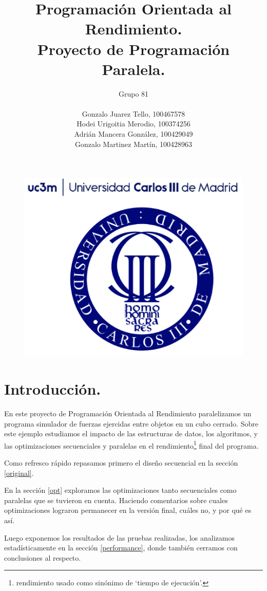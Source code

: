 \documentclass{article}
\title{Programación Orientada al Rendimiento.\\Proyecto de Programación Paralela.}
\author{Grupo 81\\ \\
	Gonzalo Juarez Tello, 100467578\\
	Hodei Urigoitia Merodio, 100374256\\
	Adrián Mancera González, 100429049\\
	Gonzalo Martinez Martín, 100428963
}
\date{}
\begin{document}
\begin{figure}
	\includegraphics[width=\linewidth,height=0.7\textwidth]{resources/logo_uc3m.png}
\end{figure}
\maketitle
\newpage

\tableofcontents
\newpage

\section{Introducción.\label{intro}}
En este proyecto de Programación Orientada al Rendimiento paralelizamos
un programa simulador de fuerzas ejercidas entre objetos
en un cubo cerrado. Sobre este ejemplo estudiamos el impacto de las
estructuras de datos, los algoritmos, y las optimizaciones secuenciales
y paralelas en el rendimiento\footnote{rendimiento usado como sinónimo de
`tiempo de ejecución'.} final del programa.

Como refresco rápido repasamos primero el diseño secuencial en la sección \ref{original}.


En la sección \ref{opt} exploramos las optimizaciones tanto secuenciales como
paralelas que se tuvieron en cuenta. Haciendo comentarios
sobre cuales optimizaciones lograron permanecer en la versión final, cuáles no, y por qué es así.


Luego exponemos los resultados de las pruebas realizadas, los analizamos estadísticamente en la sección \ref{performance},
donde también cerramos con conclusiones al respecto.
\end{document}
